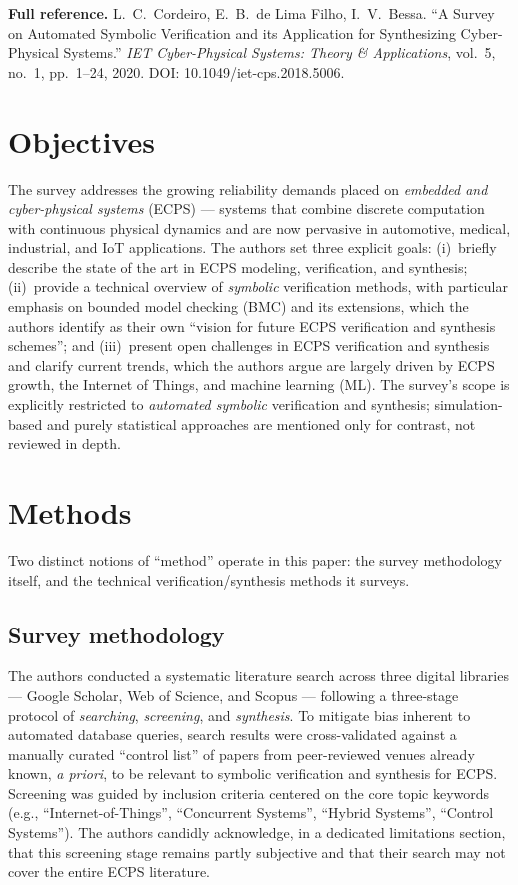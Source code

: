\documentclass[12pt,a4paper]{article}
\begin{document}
\begin{tcolorbox}[infobox]
\textbf{Full reference.} L.~C.~Cordeiro, E.~B.~de Lima Filho, I.~V.~Bessa. ``A Survey on
Automated Symbolic Verification and its Application for Synthesizing Cyber-Physical Systems.''
\emph{IET Cyber-Physical Systems: Theory \& Applications}, vol.~5, no.~1, pp.~1--24, 2020.
DOI: 10.1049/iet-cps.2018.5006.
\end{tcolorbox}

\section{Objectives}

The survey addresses the growing reliability demands placed on \emph{embedded and
cyber-physical systems} (ECPS) --- systems that combine discrete computation with continuous
physical dynamics and are now pervasive in automotive, medical, industrial, and IoT
applications. The authors set three explicit goals: (i)~briefly describe the state of the art
in ECPS modeling, verification, and synthesis; (ii)~provide a technical overview of
\emph{symbolic} verification methods, with particular emphasis on bounded model checking (BMC)
and its extensions, which the authors identify as their own ``vision for future ECPS
verification and synthesis schemes''; and (iii)~present open challenges in ECPS verification
and synthesis and clarify current trends, which the authors argue are largely driven by ECPS
growth, the Internet of Things, and machine learning (ML). The survey's scope is explicitly
restricted to \emph{automated symbolic} verification and synthesis; simulation-based and purely
statistical approaches are mentioned only for contrast, not reviewed in depth.

\section{Methods}

Two distinct notions of ``method'' operate in this paper: the survey methodology itself, and
the technical verification/synthesis methods it surveys.

\subsection{Survey methodology}

The authors conducted a systematic literature search across three digital libraries --- Google
Scholar, Web of Science, and Scopus --- following a three-stage protocol of \emph{searching},
\emph{screening}, and \emph{synthesis}. To mitigate bias inherent to automated database
queries, search results were cross-validated against a manually curated ``control list'' of
papers from peer-reviewed venues already known, \emph{a priori}, to be relevant to
symbolic verification and synthesis for ECPS. Screening was guided by inclusion criteria
centered on the core topic keywords (e.g., ``Internet-of-Things'', ``Concurrent Systems'',
``Hybrid Systems'', ``Control Systems''). The authors candidly acknowledge, in a dedicated
limitations section, that this screening stage remains partly subjective and that their search
may not cover the entire ECPS literature.
\end{document}

